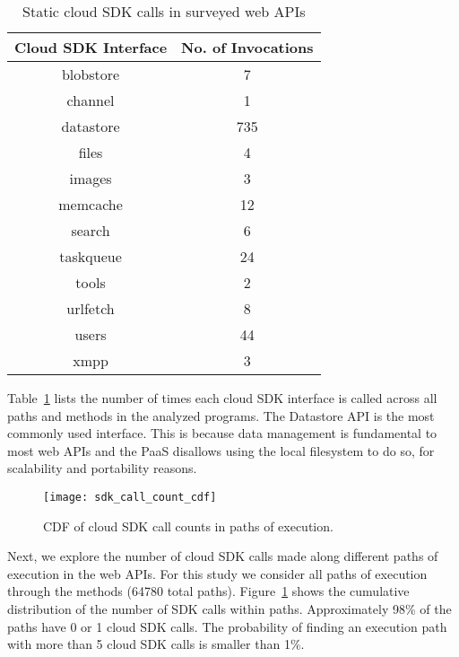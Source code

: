 \begin{table}
\caption{Static cloud SDK calls in surveyed web APIs
\label{tab:sdk_call_counts}
}
\begin{center}
\begin{tabular}{|c|c|}
\hline
Cloud SDK Interface & No. of Invocations \\ \hline
blobstore & 7 \\ \hline
channel & 1 \\ \hline
datastore & 735 \\ \hline
files & 4 \\ \hline
images & 3 \\ \hline
memcache & 12 \\ \hline
search & 6 \\ \hline
taskqueue & 24 \\ \hline
tools & 2 \\ \hline
urlfetch & 8 \\ \hline
users & 44 \\ \hline
xmpp & 3 \\ \hline
\end{tabular}
\end{center}
\vspace{-0.2in}
\end{table}

Table~\ref{tab:sdk_call_counts} lists the number of times each cloud 
SDK interface is called across all paths and methods in the analyzed programs.
The Datastore API is the most commonly used interface.
This is because data management is fundamental 
to most web APIs and the PaaS
disallows using the local filesystem to do so,
for scalability and portability reasons.

\begin{figure}
\centering
\texttt{[image: sdk\_call\_count\_cdf]}
\caption{CDF of cloud SDK call counts in paths of execution.
\label{fig:sdk_call_count_cdf}
}
\vspace{-0.1in}
\end{figure}

Next, we explore the number of cloud SDK calls made along 
different paths of execution in the web APIs. For this study
we consider all paths of execution through the methods (64780 total paths). 
Figure~\ref{fig:sdk_call_count_cdf}
shows the cumulative distribution of the number of SDK calls within paths.
Approximately 98\% of the paths have 0 or 1 cloud SDK calls. 
The probability of finding an execution path with more than
5 cloud SDK calls is smaller than 1\%.

